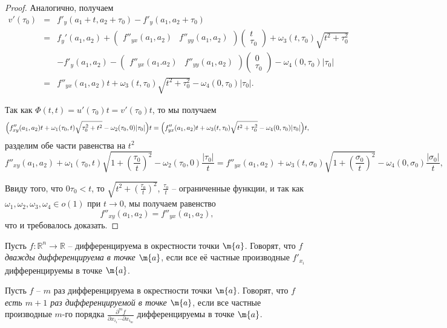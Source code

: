 \begin{proof}
Аналогично, получаем
\begin{eqnarray*}
    v'(\tau_0) &=& f'_y(a_1 + t, a_2 + \tau_0) - f'_y(a_1, a_2+\tau_0) \\
    &=& f_y'(a_1, a_2) + \begin{pmatrix}
        f''_{yx}(a_1,a_2) & f''_{yy}(a_1,a_2) 
    \end{pmatrix} \begin{pmatrix} t\\ \tau_0
    \end{pmatrix} + \omega_3(t,\tau_0)\sqrt{t^2 +\tau_0^2} \\
    &&- f'_y(a_1,a_2) - \begin{pmatrix}
        f''_{yx}(a_1.a_2) & f''_{yy}(a_1,a_2)
    \end{pmatrix} \begin{pmatrix}
        0 \\ \tau_0
    \end{pmatrix} - \omega_4(0,\tau_0)|\tau_0| \\
    &=& f''_{yx}(a_1,a_2)t + \omega_3(t,\tau_0)\sqrt{t^2 +\tau_0^2} - \omega_4(0,\tau_0)|\tau_0|.
\end{eqnarray*}

Так как $\Phi(t,t) = u'(\tau_0)t = v'(\tau_0)t$, то мы получаем
\[
 \Bigl( f''_{xy}(a_1,a_2) t + \omega_1(\tau_0, t) \sqrt{\tau_0^2 +t^2}- \omega_2(\tau_0, 0) |\tau_0| \Bigr) t = \Bigl( f''_{yx}(a_1,a_2)t + \omega_3(t,\tau_0)\sqrt{t^2 +\tau_0^2} - \omega_4(0,\tau_0)|\tau_0| \Bigr)t,
\]
разделим обе части равенства на $t^2$
\[
  f''_{xy}(a_1,a_2) + \omega_1(\tau_0, t) \sqrt{1+ \left(\frac{\tau_0}{t}\right)^2}- \omega_2(\tau_0, 0) \frac{|\tau_0|}{t}=  f''_{yx}(a_1,a_2) + \omega_3(t,\sigma_0)\sqrt{1 +\left(\frac{\sigma_0}{t}\right)^2} - \omega_4(0,\sigma_0)\frac{|\sigma_0|}{t},
\]


Ввиду того, что $0 \tau_0 <t$, то $\sqrt{t^2 + (\frac{\tau_0}{t})^2}$, $\frac{\tau_0}{t}$ -- ограниченные функции, и так как $\omega_1, \omega_2, \omega_3, \omega_4 \in o(1)$ при $t \to 0$, мы получаем равенство
\[
  f''_{xy}(a_1,a_2) =  f''_{yx}(a_1,a_2),
\]
что и требовалось доказать.    
\end{proof}


\begin{definition}
    Пусть $f:\mathbb{R}^n \to \mathbb{R}$ -- дифференцируема в окрестности точки $\m{a}$. Говорят, что $f$ \textit{дважды дифференцируема в точке $\m{a}$}, если все её частные производные $f'_{x_i}$ дифференцируемы в точке $\m{a}$.

    Пусть $f$ -- $m$ раз дифференцируема в окрестности точки $\m{a}$. Говорят, что \textit{$f$ есть $m+1$ раз дифференцируемой в точке $\m{a}$}, если все частные производные $m$-го порядка $\frac{\partial^m f}{\partial x_{i_1} \cdots \partial x_{i_m}}$ дифференцируемы в точке $\m{a}$.
\end{definition}


